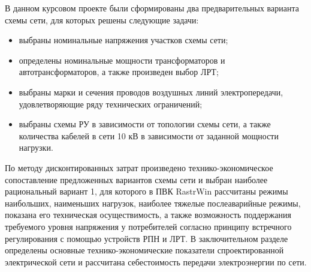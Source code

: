 \Conclusion

В данном курсовом проекте были сформированы два предварительных варианта схемы сети, для которых решены следующие задачи:
\begin{itemize}
\item выбраны номинальные напряжения участков схемы сети; 
\item определены номинальные мощности трансформаторов и автотрансформаторов, а также произведен выбор ЛРТ;
\item выбраны марки и сечения проводов воздушных линий электропередачи, удовлетворяющие ряду технических ограничений;
\item выбраны схемы РУ в зависимости от топологии схемы сети, а также количества кабелей в сети 10 кВ в зависимости от заданной мощности нагрузки.
\end{itemize}

По методу дисконтированных затрат произведено технико-экономическое сопоставление предложенных вариантов схемы сети и выбран наиболее рациональный вариант 1, для которого в ПВК RastrWin рассчитаны режимы наибольших, наименьших нагрузок, наиболее тяжелые послеаварийные режимы, показана его техническая осуществимость, а также возможность поддержания требуемого уровня напряжения у потребителей согласно принципу встречного регулирования с помощью устройств РПН и ЛРТ.
В заключительном разделе определены основные технико-экономические показатели спроектированной электрической сети и рассчитана себестоимость передачи электроэнергии по сети.